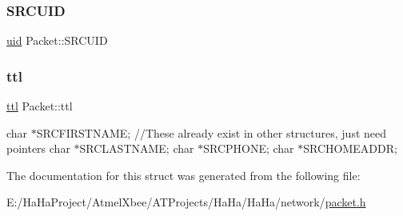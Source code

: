 \mbox{\label{struct_packet_a3cef7ca885da48680c0646ae307db4a4}} 
\subsubsection{\texorpdfstring{S\+R\+C\+U\+ID}{SRCUID}}
{\footnotesize\ttfamily \hyperlink{haha_utils_8h_ac065f913fb79988aec421b0f5eebbc77}{uid} Packet\+::\+S\+R\+C\+U\+ID}

\mbox{\label{struct_packet_a63433ac4a59b48ac4c2dee5c330eb99d}} 
\subsubsection{\texorpdfstring{ttl}{ttl}}
{\footnotesize\ttfamily \hyperlink{haha_utils_8h_a22ca626eb8f0deb847d1fae89476e26d}{ttl} Packet\+::ttl}

char $\ast$\+S\+R\+C\+F\+I\+R\+S\+T\+N\+A\+ME; //\+These already exist in other structures, just need pointers char $\ast$\+S\+R\+C\+L\+A\+S\+T\+N\+A\+ME; char $\ast$\+S\+R\+C\+P\+H\+O\+NE; char $\ast$\+S\+R\+C\+H\+O\+M\+E\+A\+D\+DR; 

The documentation for this struct was generated from the following file\+:\begin{DoxyCompactItemize}
\item 
E\+:/\+Ha\+Ha\+Project/\+Atmel\+Xbee/\+A\+T\+Projects/\+Ha\+Ha/\+Ha\+Ha/network/\hyperlink{packet_8h}{packet.\+h}\end{DoxyCompactItemize}
